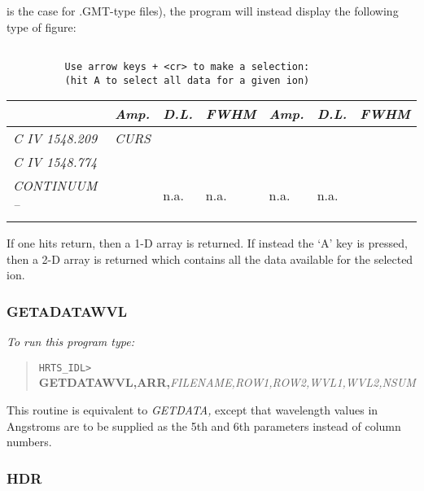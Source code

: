   is the case for .GMT-type files), the program will instead display the
  following type of figure:
\begin{verbatim}

          Use arrow keys + <cr> to make a selection:
          (hit A to select all data for a given ion)
\end{verbatim}
\begin{center}
\begin{tabular}{|l l l l l l l l|}
\hline
   &       & {\em Amp.} & {\em D.L.} & {\em FWHM} & {\em Amp.} & {\em D.L.} &
{\em FWHM} \\
\hline
\multicolumn{2}{|l|}{\em C IV  1548.209} & \multicolumn{6}{l|}{\em CURS} \\
\cline{3-8}
\multicolumn{2}{|l|}{\em C IV  1548.774} &  &  &  &  &
\multicolumn{2}{l|}{} \\
\multicolumn{2}{|l|}{\em CONTINUUM --} & &  n.a. &  n.a. &  n.a.&
\multicolumn{2}{l|}{n.a.} \\ \cline{3-8}
  & & & & & & &   \\ \hline
\end{tabular}
\end{center}
   If one hits return, then a 1-D array is returned.  If instead the
  `A' key is pressed, then a 2-D array is returned which contains all the
   data available for the selected ion.

\subsubsection{GETADATAWVL}

{\em To run this program type:}
\begin{quote}
{\tt HRTS\_IDL> }{\bf GETDATAWVL,ARR,}{\em FILENAME,ROW1,ROW2,WVL1,WVL2,NSUM}
\end{quote}
 This routine is equivalent to {\em GETDATA,} except that wavelength values
 in Angstroms are to be supplied as the 5th and 6th parameters instead
 of column numbers.

\subsubsection{HDR}

